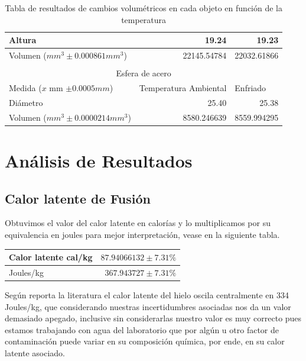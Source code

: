 \documentclass{article}
\begin{document}
\begin{table}[h]
\begin{tabular}{lrr}
\multicolumn{1}{|l|}{Altura}                             & \multicolumn{1}{r|}{19.24}                 & \multicolumn{1}{r|}{19.23}       \\ \hline
\multicolumn{1}{|l|}{Volumen ($mm^3 \pm 0.000861mm^3$)}  & \multicolumn{1}{r|}{22145.54784}           & \multicolumn{1}{r|}{22032.61866} \\ \hline
                                                         & \multicolumn{1}{l}{}                       & \multicolumn{1}{l}{}             \\ \hline
\multicolumn{3}{|c|}{Esfera de acero}                                                                                                    \\ \hline
\multicolumn{1}{|l|}{Medida ($x$ mm $\pm 0.0005mm$)}     & \multicolumn{1}{l|}{Temperatura Ambiental} & \multicolumn{1}{l|}{Enfriado}    \\ \hline
\multicolumn{1}{|l|}{Diámetro}                           & \multicolumn{1}{r|}{25.40}                 & \multicolumn{1}{r|}{25.38}       \\ \hline
\multicolumn{1}{|l|}{Volumen ($mm^3 \pm 0.0000214mm^3$)} & \multicolumn{1}{r|}{8580.246639}           & \multicolumn{1}{r|}{8559.994295} \\ \hline
\end{tabular}
\caption{Tabla de resultados de cambios volumétricos en cada objeto en función de la temperatura}
\label{Volumenes}
\end{table}

\section{Análisis de Resultados}
\subsection{Calor latente de Fusión}

Obtuvimos el valor del calor latente en calorías y lo multiplicamos por su equivalencia en joules para mejor interpretación, vease en la siguiente tabla.
\begin{table}[h]
\begin{tabular}{|l|r|}
\hline
Calor latente cal/kg & $87.94066132 \pm 7.31\%$ \\ \hline
Joules/kg            & $367.943727 \pm 7.31\%$  \\ \hline
\end{tabular}
\end{table}
Según reporta la literatura el calor latente del hielo oscila centralmente en 334 Joules/kg, que considerando nuestras incertidumbres asociadas nos da un valor demasiado apegado, inclusive sin considerarlas nuestro valor es muy correcto pues estamos trabajando con agua del laboratorio que por algún u otro factor de contaminación puede variar en su composición química, por ende, en su calor latente asociado.
\end{document}
